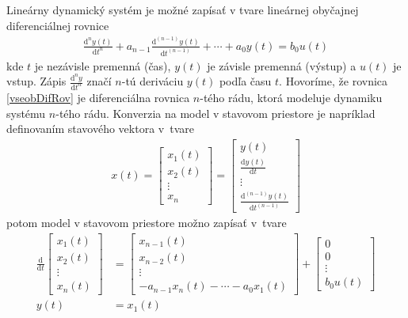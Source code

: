 \documentclass[a4paper, 10pt, ]{article}
\begin{document}
Lineárny dynamický systém je možné zapísať v tvare lineárnej obyčajnej diferenciálnej rovnice
\begin{align} \label{vseobDifRov}
	\frac{\text{d}^n y(t)}{\text{d}t^n} + a_{n-1} \frac{\text{d}^{(n-1)} y(t)}{\text{d}t^{(n-1)}} + \cdots + a_0 y(t) = b_0 u(t)
\end{align}
kde $t$ je nezávisle premenná (čas), $y(t)$ je závisle premenná (výstup) a $u(t)$ je vstup. Zápis $\frac{\text{d}^n y}{\text{d}t^n}$ značí $n$-tú deriváciu $y(t)$ podľa času $t$. Hovoríme, že rovnica \eqref{vseobDifRov} je diferenciálna rovnica $n$-tého rádu, ktorá modeluje dynamiku systému $n$-tého rádu. Konverzia na model v stavovom priestore je napríklad definovaním stavového vektora v~tvare
\begin{align}
	x(t)
	=
	\begin{bmatrix}
		x_1(t) \\ x_2(t) \\ \vdots \\ x_n
	\end{bmatrix}
	=
	\begin{bmatrix}
		y(t) \\ \frac{\text{d}y(t)}{\text{d}t} \\ \vdots \\ \frac{\text{d}^{(n-1)} y(t)}{\text{d}t^{(n-1)}}
	\end{bmatrix}
\end{align}
potom model v stavovom priestore možno zapísať v~tvare
\begin{subequations}
\begin{align}
	\frac{\text{d}}{\text{d}t}
	\begin{bmatrix}
		x_1(t) \\ x_2(t) \\ \vdots \\ x_n(t)
	\end{bmatrix}
	&=
	\begin{bmatrix}
		x_{n-1}(t) \\ x_{n-2}(t) \\ \vdots \\ -a_{n-1} x_n(t) - \cdots - a_0 x_1(t)
	\end{bmatrix}
	+
	\begin{bmatrix}
		0 \\ 0 \\ \vdots \\ b_0 u(t)
	\end{bmatrix}
	\\
	y(t) &= x_1(t)
\end{align}
\end{subequations}
\end{document}
